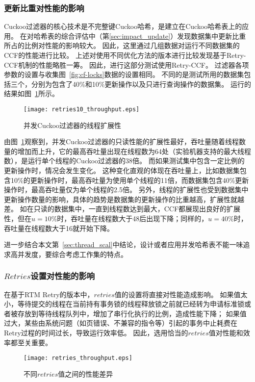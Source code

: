 \subsubsection{更新比重对性能的影响}
Cuckoo过滤器的核心技术是不完整键Cuckoo哈希，是建立在Cuckoo哈希表上的应用。
在对哈希表的综合评估中（第\ref{sec:impact_update}）发现数据集中更新比重所占的比例对性能的影响较大。
因此，这里通过几组数据对运行不同数据集的CCF的性能进行比较。
上述对使用不同优化方法的版本进行比较发现基于Retry-CCF机制的性能略胜一筹。
因此，进行这部分测试使用Retry-CCF。
过滤器各项参数的设置与收集图~\ref{fig:cf-locks}数据的设置相同。
不同的是测试所用的数据集包括三个，分别为包含了40\%和10\%更新操作以及只进行查询操作的数据集。
运行的结果如图~\ref{fig:retry_thp}所示。

\begin{figure}[htbp]
\centering
\texttt{[image: retries10\_throughput.eps]}
\caption{并发Cuckoo过滤器的线程扩展性}\label{fig:retry_thp}
\end{figure}

由图~\ref{fig:retry_thp}观察到，并发Cuckoo过滤器的只读性能的扩展性最好，吞吐量随着线程数量的增加而上升，它的最高吞吐量出现在线程数为64处（实验机器支持的最大线程数），是运行单个线程的Cuckoo过滤器的38倍。
而如果测试集中包含一定比例的更新操作时，情况会发生变化。
这种变化直观的体现在吞吐量上，比如数据集包含10\%的更新操作时，最高吞吐量为使用单个线程的11倍，而数据集包含40\%更新操作时，最高吞吐量仅为单个线程的2.5倍。
另外，线程的扩展性也受到数据集中更新操作数量的影响，具体的趋势是数据集的更新操作的比重越高，扩展性就越差。
如在只读的数据集中，一直到线程数达到最大，CCF都展现出良好的扩展性，但在$u = 10\%$时，吞吐量在线程数大于48后出现下降；同样的，$u = 40\%$时，吞吐量在线程数大于16就开始下降。

进一步结合本文第~\ref{sec:thread_scal}中结论，设计或者应用并发哈希表不能一味追求高并发度，要综合考虑工作集的特点。

\subsubsection{$Retries$设置对性能的影响}
在基于RTM Retry的版本中，$retries$值的设置将直接对性能造成影响。
如果值太小，等待提交的线程在当前持有事务锁的线程释放锁之前就已经转为申请标准锁或者被存放到等待线程队列中，增加了串行化执行的比例，造成性能下降；
如果值过大，某些由系统问题（如页错误、不兼容的指令等）引起的事务中止耗费在Retry过程的时间过长，导致运行效率低。
因此，选用恰当的$retries$值对性能和效率都至关重要。

\begin{figure}[htbp]
\centering
\texttt{[image: retries\_throughput.eps]}
\caption{不同$retries$值之间的性能差异}\label{fig:diff-retry}
\end{figure}

